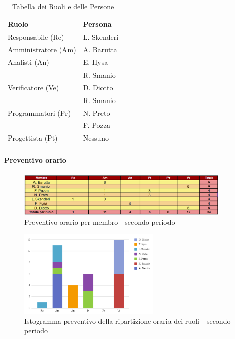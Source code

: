 \begin{table}[H]
    \centering
    \begin{tabular}{|l|l|}
    \hline
    \textbf{Ruolo} & \textbf{Persona} \\
    \hline
    \hline
    Responsabile (Re) & L. Skenderi \\
    \hline
    Amministratore (Am) & A. Barutta \\
    \hline
    Analisti (An) & E. Hysa \\
     & R. Smanio \\
     \hline
    Verificatore (Ve) & D. Diotto \\
     & R. Smanio \\
     \hline
    Programmatori (Pr) & N. Preto \\
     & F. Pozza \\
     \hline
    Progettista (Pt) & Nessuno \\
    \hline
    \end{tabular}
    \caption{Tabella dei Ruoli e delle Persone}
    \label{tab:Ruoli_persone_2}
    \end{table}
    

\paragraph*{Preventivo orario} \hspace{1pt}

\begin{figure}[H]
    \centering
    \includegraphics[width=0.9\textwidth]{../Images/preventivoOrario2Periodo.png}
    \caption{Preventivo orario per membro - secondo periodo}
    \label{fig:Preventivo_orario_2}
\end{figure}

\begin{figure}[H]
    \centering
    \includegraphics[width=0.6\textwidth]{../Images/preventivoDivisioneRuoli2Periodo.png}
    \caption{Istogramma preventivo della ripartizione oraria dei ruoli - secondo periodo}
    \label{fig:Preventivo_ripartizione_oraria_2}
\end{figure}

